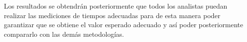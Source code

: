     Los resultados se obtendrán posteriormente que todos los analistas puedan realizar las mediciones de tiempos adecuadas para de esta manera poder garantizar que se obtiene el valor esperado adecuado y así poder posteriormente compararlo con las demás metodologías.
    
    
    
    
    
    
    
